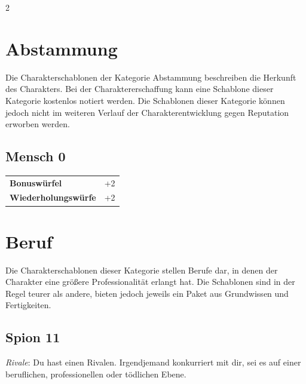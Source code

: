 \label{ch:appendix-templates}

\begin{multicols}{2}

\section{Abstammung}

Die Charakterschablonen der Kategorie Abstammung beschreiben die Herkunft des Charakters. Bei der Charaktererschaffung kann eine Schablone dieser Kategorie kostenlos notiert werden. Die Schablonen dieser Kategorie können jedoch nicht im weiteren Verlauf der Charakterentwicklung gegen Reputation erworben werden.

\begin{tcolorbox}
    \subsection*{Mensch \hfill \small{0 }}
    \tcblower




\begin{tabular}{@{}ll@{}}
    \textbf{Bonuswürfel} & +2\\
    \textbf{Wiederholungswürfe} & +2\\
\end{tabular}


\end{tcolorbox}

\section{Beruf}

Die Charakterschablonen dieser Kategorie stellen Berufe dar, in denen der Charakter eine größere Professionalität erlangt hat. Die Schablonen sind in der Regel teurer als andere, bieten jedoch jeweils ein Paket aus Grundwissen und Fertigkeiten.

\begin{tcolorbox}
    \subsection*{Spion \hfill \small{11 }}
    \tcblower
\textit{Rivale}: Du hast einen Rivalen. Irgendjemand konkurriert mit dir, sei es auf einer beruflichen, professionellen oder tödlichen Ebene.



\end{tcolorbox}
\end{multicols}
